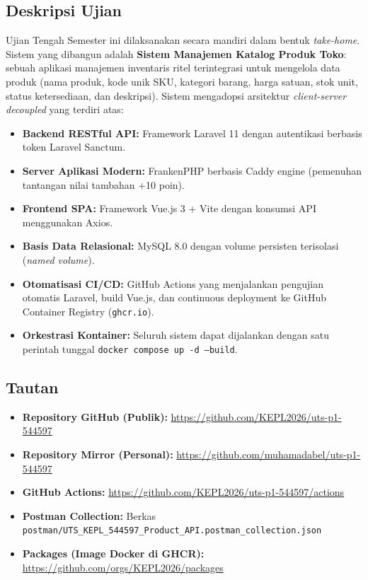 \documentclass[11pt,a4paper]{article}
\begin{document}
\subsection{Deskripsi Ujian}
Ujian Tengah Semester ini dilaksanakan secara mandiri dalam bentuk \textit{take-home}. Sistem yang dibangun adalah \textbf{Sistem Manajemen Katalog Produk Toko}: sebuah aplikasi manajemen inventaris ritel terintegrasi untuk mengelola data produk (nama produk, kode unik SKU, kategori barang, harga satuan, stok unit, status ketersediaan, dan deskripsi). Sistem mengadopsi arsitektur \textit{client-server decoupled} yang terdiri atas:
\begin{itemize}
    \item \textbf{Backend RESTful API:} Framework Laravel 11 dengan autentikasi berbasis token Laravel Sanctum.
    \item \textbf{Server Aplikasi Modern:} FrankenPHP berbasis Caddy engine (pemenuhan tantangan nilai tambahan +10 poin).
    \item \textbf{Frontend SPA:} Framework Vue.js 3 + Vite dengan konsumsi API menggunakan Axios.
    \item \textbf{Basis Data Relasional:} MySQL 8.0 dengan volume persisten terisolasi (\textit{named volume}).
    \item \textbf{Otomatisasi CI/CD:} GitHub Actions yang menjalankan pengujian otomatis Laravel, build Vue.js, dan continuous deployment ke GitHub Container Registry (\texttt{ghcr.io}).
    \item \textbf{Orkestrasi Kontainer:} Seluruh sistem dapat dijalankan dengan satu perintah tunggal \texttt{docker compose up -d --build}.
\end{itemize}

\subsection{Tautan}
\begin{itemize}
    \item \textbf{Repository GitHub (Publik):} \url{https://github.com/KEPL2026/uts-p1-544597}
    \item \textbf{Repository Mirror (Personal):} \url{https://github.com/muhamadabel/uts-p1-544597}
    \item \textbf{GitHub Actions:} \url{https://github.com/KEPL2026/uts-p1-544597/actions}
    \item \textbf{Postman Collection:} Berkas \texttt{postman/UTS\_KEPL\_544597\_Product\_API.postman\_collection.json}
    \item \textbf{Packages (Image Docker di GHCR):} \url{https://github.com/orgs/KEPL2026/packages}
\end{itemize}
\end{document}
